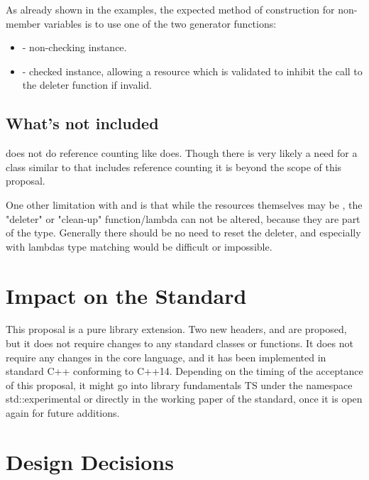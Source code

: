 \documentclass[ebook,11pt,article]{memoir}
\begin{document}
As already shown in the examples, the expected method of construction for non-member variables is to use one of the two generator functions:
\begin{itemize}
\item {} - non-checking instance.
\item {} - checked instance, allowing a resource which is validated to inhibit the call to the deleter function if invalid.
\end{itemize}

\section{What's not included}
 does not do reference counting like  does.  Though there is very likely a need for a class similar to  that includes reference counting it is beyond the scope of this proposal.

One other limitation with  and  is that while the resources themselves may be , the "deleter" or "clean-up" function/lambda can not be altered, because they are part of the type.  Generally there should be no need to reset the deleter, and especially with lambdas type matching would be difficult or impossible.

\chapter{Impact on the Standard}
This proposal is a pure library extension. Two new headers,  and  are proposed, but it does not require changes to any standard classes or functions. It does not require any changes in the core language, and it has been implemented in standard C++ conforming to C++14. Depending on the timing of the acceptance of this proposal, it might go into library fundamentals TS under the namespace std::experimental or directly in the working paper of the standard, once it is open again for future additions.

\chapter{Design Decisions}
\end{document}

